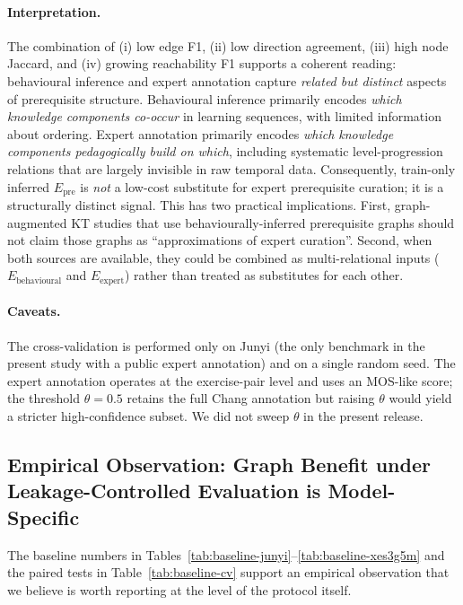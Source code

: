\documentclass[pdflatex,sn-basic]{sn-jnl}
\newcommand{\Epre}{\ensuremath{E_{\text{pre}}}}
\newcommand{\KCs}{knowledge components}
\begin{document}
\paragraph{Interpretation.}
The combination of (i) low edge F1, (ii) low direction agreement,
(iii) high node Jaccard, and (iv) growing reachability F1 supports a
coherent reading: behavioural inference and expert annotation capture
\emph{related but distinct} aspects of prerequisite structure.
Behavioural inference primarily encodes \emph{which \KCs{} co-occur}
in learning sequences, with limited information about ordering.
Expert annotation primarily encodes \emph{which \KCs{} pedagogically
build on which}, including systematic level-progression relations
that are largely invisible in raw temporal data.
Consequently, train-only inferred $\Epre$ is \emph{not} a low-cost
substitute for expert prerequisite curation; it is a structurally
distinct signal. This has two practical implications. First,
graph-augmented KT studies that use behaviourally-inferred prerequisite
graphs should not claim those graphs as ``approximations of expert
curation''. Second, when both sources are available, they could be
combined as multi-relational inputs ($E_{\text{behavioural}}$ and
$E_{\text{expert}}$) rather than treated as substitutes for each other.

\paragraph{Caveats.}
The cross-validation is performed only on Junyi (the only benchmark
in the present study with a public expert annotation) and on a single
random seed. The expert annotation operates at the exercise-pair level
and uses an MOS-like score; the threshold $\theta=0.5$ retains the
full Chang annotation but raising $\theta$ would yield a stricter
high-confidence subset. We did not sweep $\theta$ in the present
release.
\subsection{Empirical Observation: Graph Benefit under
Leakage-Controlled Evaluation is Model-Specific}
\label{sec:exp-fextra}
The baseline numbers in Tables~\ref{tab:baseline-junyi}--\ref{tab:baseline-xes3g5m}
and the paired tests in Table~\ref{tab:baseline-cv} support an empirical observation
that we believe is worth reporting at the level of the protocol itself.
\end{document}
